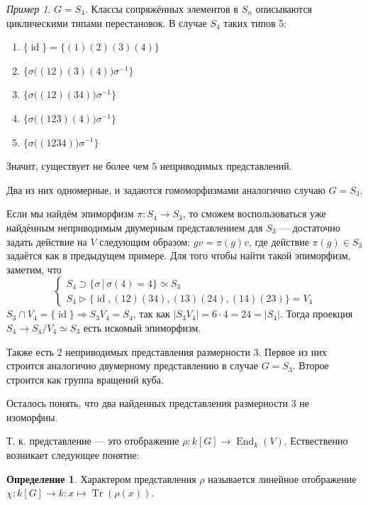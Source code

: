 \documentclass{article}
\theoremstyle{definition}
\newtheorem*{definition}{Определение}
\theoremstyle{remark}
\newtheorem*{example}{Пример}
\DeclareMathOperator{\End}{End}
\DeclareMathOperator{\id}{id}
\DeclareMathOperator{\Tr}{Tr}
\newcommand{\Ra}{\Rightarrow}
\newcommand{\inter}{\cap}
\begin{document}
\begin{example}
    $G = S_4$. Классы сопряжённых элементов в $S_n$ описываются циклическими типами перестановок. %
    В случае $S_4$ таких типов 5:
    \begin{enumerate}
        \item $\{\id\} = \{(1)(2)(3)(4)\}$
        \item $\{ \sigma \big((12)(3)(4)\big) \sigma^{-1} \}$
        \item $\{ \sigma \big((12)(34)\big) \sigma^{-1} \}$
        \item $\{ \sigma \big((123)(4)\big) \sigma^{-1} \}$
        \item $\{ \sigma \big((1234)\big) \sigma^{-1} \}$
    \end{enumerate}
    Значит, существует не более чем 5 неприводимых представлений.

    Два из них одномерные, и задаются гомоморфизмами аналогично случаю $G = S_3$.

    Если мы найдём эпиморфизм $\pi: S_4 \to S_3$, то сможем воспользоваться уже найдённым неприводимым двумерным представлением для $S_3$ --- достаточно задать действие на $V$ следующим образом: $gv = \pi(g)v$, где действие $\pi(g) \in S_3$ задаётся как в предыдущем примере.
    Для того чтобы найти такой эпиморфизм, заметим, что
    \begin{equation*}
        \begin{cases*}
            S_4 \supset \{\sigma \,|\, \sigma(4) = 4\} \simeq S_3 \\
            S_4 \vartriangleright \{\id, (12)(34), (13)(24), (14)(23)\} = V_4
        \end{cases*}
    \end{equation*}
    $S_3 \inter V_4 = \{\id\} \Ra S_3 V_4 = S_4$, так как $|S_3 V_4| = 6 \cdot 4 = 24 = |S_4|$. Тогда проекция $S_4 \to S_4 / V_4 \simeq S_3$ есть искомый эпиморфизм.

    Также есть 2 неприводимых представления размерности 3. Первое из них строится аналогично двумерному представлению в случае $G = S_3$. Второе строится как группа вращений куба. %

    Осталось понять, что два найденных представления размерности 3 не изоморфны.
\end{example}

Т. к. представление --- это отображение $\rho: k[G] \rightarrow \End_k(V)$. Ествественно возникает следующее понятие:

\begin{definition}
	Характером представления $\rho$ называется линейное отображение $\chi: k[G] \rightarrow k: x \mapsto \Tr(\rho(x))$.
\end{definition}
\end{document}
